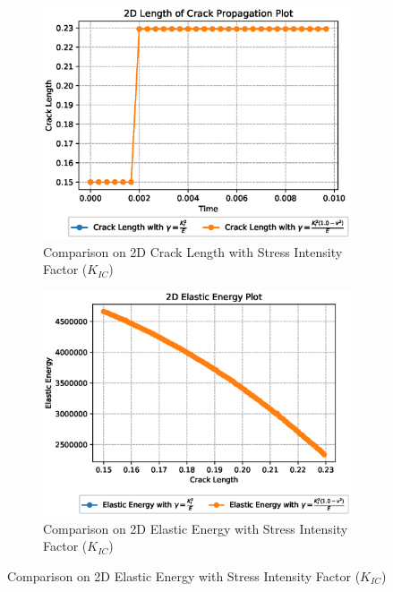 \documentclass[a4paper,11pt]{article}
\begin{document}
\begin{figure}[h!]
	\begin{subfigure}[b]{0.49\linewidth}
		\centering
		\includegraphics[width=\linewidth]{picture/conference/cracklength_2d_ki}
		\caption{Comparison on 2D Crack Length with Stress Intensity Factor ($K_{IC}$)}
		\label{fig:cracklength2dki}
	\end{subfigure}
	\begin{subfigure}[b]{0.49\linewidth}
		\centering
		\includegraphics[width=\linewidth]{picture/conference/elastic_2d_ki}
		\caption{Comparison on 2D Elastic Energy with Stress Intensity Factor ($K_{IC}$)}
		\label{fig:elastic2dki}
	\end{subfigure}
\end{figure}
\end{document}
